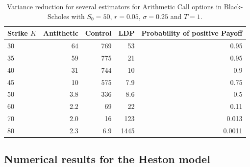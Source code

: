 \small{
\begin{table}[H]
\centering
\begin{tabular}{lrrrr}
\toprule
 Strike $K$ &  Antithetic &  Control &  LDP &  Probability of positive Payoff \\
\midrule
     30 &          64 &      769 &   53 &                            0.95 \\
     35 &          59 &      775 &   21 &                            0.95 \\
     40 &          31 &      744 &   10 &                             0.9 \\
     45 &          10 &      575 &  7.9 &                            0.75 \\
     50 &         3.8 &      336 &  8.6 &                             0.5 \\
     60 &         2.2 &       69 &   22 &                            0.11 \\
     70 &         2.0 &       16 &  123 &                           0.013 \\
     80 &         2.3 &      6.9 & 1445 &                          0.0011 \\
\bottomrule
\end{tabular}
\caption{\small{Variance reduction for several estimators for Arithmetic Call options in Black-Scholes with $S_0=50$, $r=0.05$, $\sigma = 0.25$ and $T=1$.}}\label{table:BSCompare}
\end{table}
}
\subsection{Numerical results for the Heston model}
